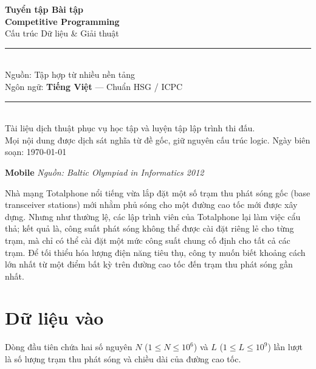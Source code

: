 \documentclass[12pt,a4paper]{article}
\newcommand{\problem}[2]{%
  \addcontentsline{toc}{section}{#1}%
  \begin{mdframed}[
    linecolor=framecolor,
    linewidth=1.5pt,
    backgroundcolor=white,
    topline=true, bottomline=true,
    leftline=true, rightline=true,
    innerleftmargin=10pt, innerrightmargin=10pt,
    innertopmargin=6pt, innerbottommargin=6pt,
  ]
  \textbf{\large #1} \hfill \textit{Nguồn: #2}
  \end{mdframed}
  \vspace{4pt}%
}
\begin{document}

\begin{titlepage}
  \centering
  \vspace*{3cm}
  {\Huge\bfseries\color{sectioncolor} Tuyển tập Bài tập\\[0.4em]
   Competitive Programming}\\[0.8em]
  {\large\color{gray} Cấu trúc Dữ liệu \& Giải thuật}\\[2em]
  \rule{\linewidth}{1pt}\\[1.5em]
  {\large Nguồn: Tập hợp từ nhiều nền tảng}\\[0.5em]
  {\large Ngôn ngữ: \textbf{Tiếng Việt} — Chuẩn HSG / ICPC}\\[2em]
  \rule{\linewidth}{1pt}\\[3em]
  {\normalsize\color{gray}
    Tài liệu dịch thuật phục vụ học tập và luyện tập lập trình thi đấu.\\
    Mọi nội dung được dịch sát nghĩa từ đề gốc, giữ nguyên cấu trúc logic.
  }
  \vfill
  {\small\color{gray} Ngày biên soạn: \today}
\end{titlepage}

\tableofcontents
\newpage








\problem{Mobile}{Baltic Olympiad in Informatics 2012}

Nhà mạng Totalphone nổi tiếng vừa lắp đặt một số trạm thu phát sóng gốc (base transceiver stations) mới nhằm phủ sóng cho một đường cao tốc mới được xây dựng. Nhưng như thường lệ, các lập trình viên của Totalphone lại làm việc cẩu thả; kết quả là, công suất phát sóng không thể được cài đặt riêng lẻ cho từng trạm, mà chỉ có thể cài đặt một mức công suất chung cố định cho tất cả các trạm. Để tối thiểu hóa lượng điện năng tiêu thụ, công ty muốn biết khoảng cách lớn nhất từ một điểm bất kỳ trên đường cao tốc đến trạm thu phát sóng gần nhất.

\section*{Dữ liệu vào}
Dòng đầu tiên chứa hai số nguyên $N$ ($1 \le N \le 10^6$) và $L$ ($1 \le L \le 10^9$) lần lượt là số lượng trạm thu phát sóng và chiều dài của đường cao tốc.
\end{document}
